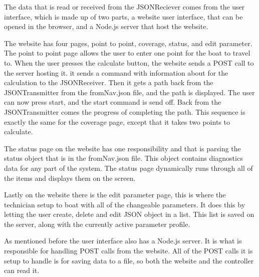The data that is read or received from the JSONReciever comes from the user interface, which is made up of two parts, a website user interface, that can be opened in the browser, and a Node.js server that host the website. 

The website has four pages, point to point, coverage, status, and edit parameter. The point to point page allows the user to enter one point for the boat to travel to. When the user presses the calculate button, the website sends a POST call to the server hosting it. it sends a command with information about for the calculation to the JSONReceiver. Then it gets a path back from the JSONTransmitter from the fromNav.json file, and the path is displayed. The user can now press start, and the start command is send off. Back from the JSONTransmitter comes the progress of completing the path. This sequence is exactly the same for the coverage page, except that it takes two points to calculate. 

The status page on the website has one responsibility and that is parsing the status object that is in the fromNav.json file. This object contains diagnostics data for any part of the system. The status page dynamically runs through all of the items and displays them on the screen.

Lastly on the website there is the edit parameter page, this is where the technician setup to boat with all of the changeable parameters. It does this by letting the user create, delete and edit JSON object in a list. This list is saved on the server, along with the currently active parameter profile. 

As mentioned before the user interface also has a Node.js server\cite{nodejs}. It is what is responsible for handling POST calls from the website. All of the POST calls it is setup to handle is for saving data to a file, so both the website and the controller can read it.



